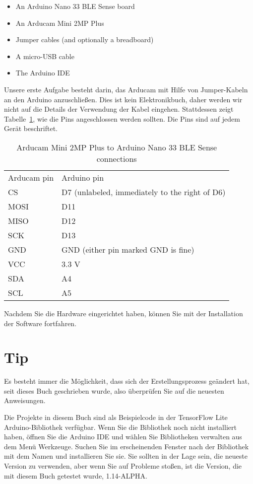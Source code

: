 \begin{itemize}
  \item An Arduino Nano 33 BLE Sense board
  \item An Arducam Mini 2MP Plus
  \item Jumper cables (and optionally a breadboard)
  \item A micro-USB cable
  \item The Arduino IDE
\end{itemize}

Unsere erste Aufgabe besteht darin, das Arducam mit Hilfe von Jumper-Kabeln an den Arduino anzuschließen. Dies ist kein Elektronikbuch, daher werden wir nicht auf die Details der Verwendung der Kabel eingehen. Stattdessen zeigt Tabelle~\ref{ArducamPins}, wie die Pins angeschlossen werden sollten. Die Pins sind auf jedem Gerät beschriftet.

\begin{table}
  \centering
  
  \begin{tabular}{ll}    
    Arducam pin & Arduino pin \\
    CS   & D7 (unlabeled, immediately to the right of D6) \\
    MOSI & D11 \\
    MISO & D12 \\
    SCK  & D13 \\
    GND  & GND (either pin marked GND is fine) \\
    VCC  & 3.3 V \\
    SDA  & A4 \\
    SCL  & A5 \\
\end{tabular}
  \caption{ Arducam Mini 2MP Plus to Arduino Nano 33 BLE Sense connections}\label{ArducamPins}
  
\end{table}

Nachdem Sie die Hardware eingerichtet haben, können Sie mit der Installation der Software fortfahren.

\section{Tip}

Es besteht immer die Möglichkeit, dass sich der Erstellungsprozess geändert hat, seit dieses Buch geschrieben wurde, also überprüfen Sie  auf die neuesten Anweisungen.

Die Projekte in diesem Buch sind als Beispielcode in der TensorFlow Lite Arduino-Bibliothek verfügbar. Wenn Sie die Bibliothek noch nicht installiert haben, öffnen Sie die Arduino IDE und wählen Sie Bibliotheken verwalten aus dem Menü Werkzeuge. Suchen Sie im erscheinenden Fenster nach der Bibliothek mit dem Namen  und installieren Sie sie. Sie sollten in der Lage sein, die neueste Version zu verwenden, aber wenn Sie auf Probleme stoßen, ist die Version, die mit diesem Buch getestet wurde, 1.14-ALPHA.

